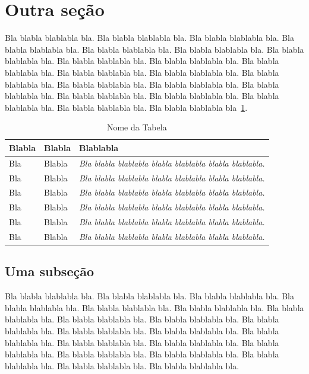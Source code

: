 \documentclass[tese,capa]{texufpel}
\begin{document}
\section{Outra seção}

Bla blabla blablabla bla.  Bla blabla blablabla bla.  Bla blabla
blablabla bla.  Bla blabla blablabla bla.  Bla blabla blablabla bla.
Bla blabla blablabla bla.  Bla blabla blablabla bla.  Bla blabla
blablabla bla.  Bla blabla blablabla bla.  Bla blabla blablabla bla.
Bla blabla blablabla bla.  Bla blabla blablabla bla.  Bla blabla
blablabla bla.  Bla blabla blablabla bla.  Bla blabla blablabla bla.
Bla blabla blablabla bla.  Bla blabla blablabla bla.  Bla blabla
blablabla bla.  Bla blabla blablabla bla.  Bla blabla blablabla bla.
Bla blabla blablabla bla~\ref{tabela}.

\begin{table}
  \begin{center}
    \caption{Nome da Tabela}\label{tabela}
    \begin{tabular}{p{4cm}p{5cm}p{6cm}}
      \hline
      Blabla & Blabla & Blablabla\\
      \hline
      {\small Bla} & {\small Blabla} & {\small\em Bla blabla blablabla blabla
        blablabla blabla blablabla.}\\
      {\small Bla} & {\small Blabla} & {\small\em Bla blabla blablabla blabla
        blablabla blabla blablabla.}\\
      {\small Bla} & {\small Blabla} & {\small\em Bla blabla blablabla blabla
        blablabla blabla blablabla.}\\
      {\small Bla} & {\small Blabla} & {\small\em Bla blabla blablabla blabla
        blablabla blabla blablabla.}\\
      {\small Bla} & {\small Blabla} & {\small\em Bla blabla blablabla blabla
        blablabla blabla blablabla.}\\
      {\small Bla} & {\small Blabla} & {\small\em Bla blabla blablabla blabla
        blablabla blabla blablabla.}\\
      \hline
    \end{tabular}
  \end{center}
\end{table}

\subsection{Uma subseção}

Bla blabla blablabla bla.  Bla blabla blablabla bla.  Bla blabla
blablabla bla.  Bla blabla blablabla bla.  Bla blabla blablabla bla.
Bla blabla blablabla bla.  Bla blabla blablabla bla.  Bla blabla
blablabla bla.  Bla blabla blablabla bla.  Bla blabla blablabla bla.
Bla blabla blablabla bla.  Bla blabla blablabla bla.  Bla blabla
blablabla bla.  Bla blabla blablabla bla.  Bla blabla blablabla bla.
Bla blabla blablabla bla.  Bla blabla blablabla bla.  Bla blabla
blablabla bla.  Bla blabla blablabla bla.  Bla blabla blablabla bla.
Bla blabla blablabla bla.
\end{document}
